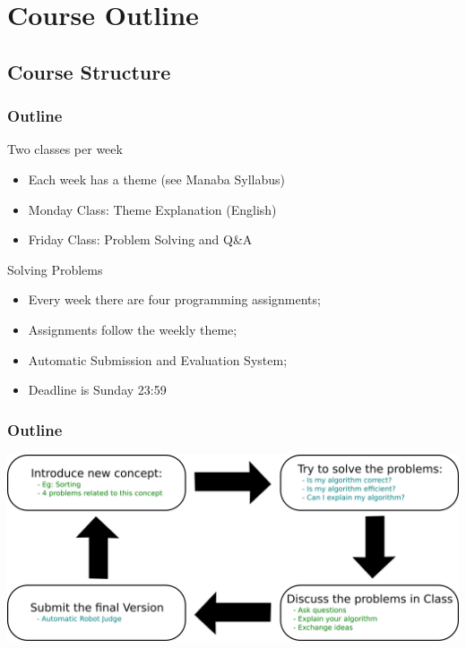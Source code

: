 \documentclass{beamer}
\begin{document}
\section{Course Outline}
\subsection{Course Structure}

\begin{frame}
    \frametitle{Outline}
    
    \begin{block}{Two classes per week}
        \begin{itemize}   
        \item Each week has a theme (see Manaba Syllabus)
        \item Monday Class: Theme Explanation (English)
        \item Friday Class: Problem Solving and Q\&A
        \end{itemize}
    \end{block}
    
    \begin{block}{Solving Problems}
        \begin{itemize}
        \item Every week there are four programming assignments;
        \item Assignments follow the weekly theme;
        \item Automatic Submission and Evaluation System;
        \item Deadline is Sunday 23:59
        \end{itemize}   
    \end{block}
\end{frame}
    
\begin{frame}
  \frametitle{Outline}
  \begin{center}
    \includegraphics[width=1\textwidth]{classoutline}
  \end{center}
\end{frame}
\end{document}
